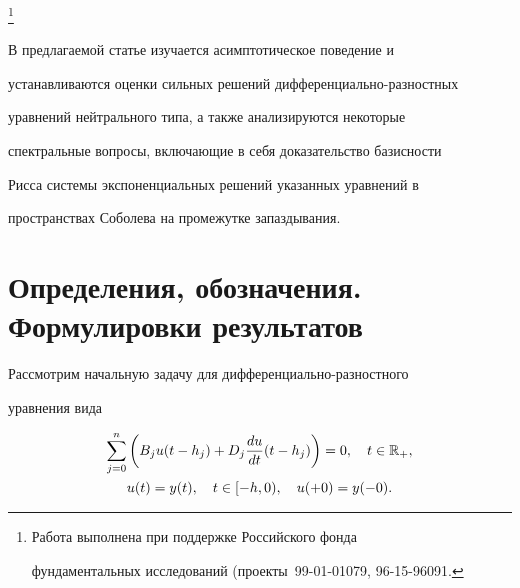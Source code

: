 \thanks{Работа выполнена при поддержке Российского фонда 


фундаментальных исследований (проекты \No\,99-01-01079, 96-15-96091.} 


 


\date{} 




\pagestyle{plain} %


 




\maketitle 


\label{begin} 


 


В предлагаемой статье изучается асимптотическое поведение и 


устанавливаются оценки сильных решений дифференциально-разностных 


уравнений нейтрального типа, а также анализируются некоторые 


спектральные вопросы, включающие в себя доказательство базисности 


Рисса системы экспоненциальных решений указанных уравнений в 


пространствах Соболева на промежутке запаздывания. 


 


\section{Определения, обозначения. Формулировки результатов} 


 


Рассмотрим начальную задачу для дифференциально-разностного 


уравнения вида 


\begin{gather} 


\sum^n_{j=0}\bigg(B_j u(t-h_j)+D_j\frac{du}{dt} 


(t-h_j)\bigg)=0,\quad t\in\Bbb R_+,\\ 


% 


u(t)=y(t),\quad t\in[-h,0),\quad u(+0)=y(-0). 


\end{gather} 


